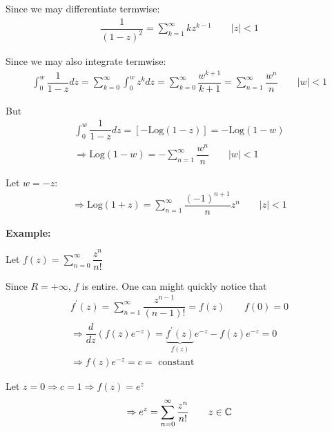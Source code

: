 \noindent Since we may differentiate termwise:
\begin{equation*}
  \begin{gathered}
    \dfrac{1}{(1-z)^2} = \sum_{k=1}^{\infty}kz^{k-1}\qquad \left|z\right|<1
  \end{gathered}
\end{equation*}\par
\noindent Since we may also integrate termwise:
\begin{equation*}
  \begin{gathered}
    \int_{0}^{w}\dfrac{1}{1-z}dz = \sum_{k=0}^{\infty}\int_{0}^{w}z^kdz = \sum_{k=0}^{\infty}\dfrac{w^{k+1}}{k+1} = \sum_{n=1}^{\infty}\dfrac{w^n}{n}\qquad\left|w\right|<1
  \end{gathered}
\end{equation*}\par
\noindent But
\begin{equation*}
  \begin{gathered}
    \int_{0}^{w}\dfrac{1}{1-z}dz = [-\text{Log}(1-z)] = -\text{Log}(1-w)\\
    \Rightarrow\text{Log}(1-w) = -\sum_{n=1}^{\infty}\dfrac{w^n}{n}\qquad\left|w\right|<1
  \end{gathered}
\end{equation*}\par
\noindent Let $w = -z$:
\begin{equation*}
  \begin{gathered}
    \Rightarrow\text{Log}(1+z) = \sum_{n=1}^{\infty}\dfrac{(-1)^{n+1}}{n}z^n\qquad\left|z\right|<1
  \end{gathered}
\end{equation*}
\par\bigskip
\noindent \textbf{Example:}\par
\noindent Let $f(z) = \sum_{n=0}^{\infty}\dfrac{z^n}{n!}$\par
\noindent Since $R = +\infty$, $f$ is entire. One can might quickly notice that
\begin{equation*}
  \begin{gathered}
    f^{\prime}(z) = \sum_{n=1}^{\infty}\dfrac{z^{n-1}}{(n-1)!} = f(z)\qquad f(0) = 0\\
    \Rightarrow\dfrac{d}{dz}(f(z)e^{-z}) = \underbrace{f^{\prime}(z)}_{\text{$f(z)$}}e^{-z}-f(z)e^{-z} = 0\\
    \Rightarrow f(z)e^{-z} = c = \text{ constant}
  \end{gathered}
\end{equation*}\par
\noindent Let $z = 0\Rightarrow c=1\Rightarrow f(z) = e^z$
\begin{equation*}
  \begin{gathered}
    \Rightarrow e^z = \sum_{n=0}^{\infty}\dfrac{z^n}{n!}\qquad z\in\mathbb{C}
  \end{gathered}
\end{equation*}
\par\bigskip
